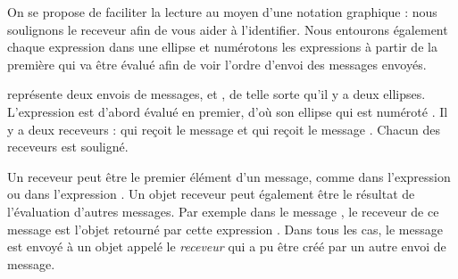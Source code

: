 \documentclass[a4paper,10pt,twoside]{book}
\begin{document}


On se propose de faciliter la lecture au moyen d'une notation graphique : nous soulignons le receveur afin de vous aider \`a l'identifier. Nous entourons \'egalement chaque expression dans une ellipse et num\'erotons les expressions \`a partir de la premi\`ere qui va \^etre \'evalu\'e afin de voir l'ordre d'envoi des messages envoy\'es.


 repr\'esente deux envois de messages,  et , de telle sorte qu'il y a deux ellipses. L'expression  est d'abord \'evalu\'e en premier, d'o\`u son ellipse qui est num\'erot\'e . Il y a deux receveurs :  qui re\c{c}oit le message  et  qui re\c{c}oit le message . Chacun des receveurs est soulign\'e.

Un receveur peut \^etre le premier \'el\'ement d'un message, comme  dans l'expression  ou  dans l'expression . Un objet receveur peut \'egalement \^etre le r\'esultat de l'\'evaluation d'autres messages. Par exemple dans le message , le receveur de ce message  est l'objet retourn\'e par cette expression . Dans tous les cas, le message est envoy\'e \`a un objet appel\'e le \emph{receveur} qui a pu \^etre cr\'e\'e par un autre envoi de message.
\end{document}
